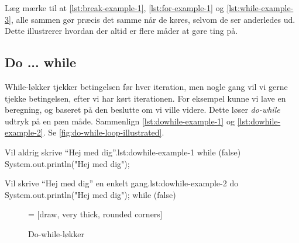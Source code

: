         Læg mærke til at \autoref{lst:break-example-1},
        \autoref{lst:for-example-1} og \autoref{lst:while-example-3}, alle
        sammen gør præcis det samme når de køres, selvom de ser
        anderledes ud. Dette illustrerer hvordan der altid er flere
        måder at gøre ting på.


	\subsection{Do ... while}

        While-løkker tjekker betingelsen før hver iteration, men nogle
        gang vil vi gerne tjekke betingelsen, efter vi har kørt
        iterationen. For eksempel kunne vi lave en beregning, og
        baseret på den beslutte om vi ville videre. Dette løser
        \emph{do-while} udtryk på en pæn måde. Sammenlign
        \autoref{lst:dowhile-example-1} og
        \autoref{lst:dowhile-example-2}. Se \autoref{fig:do-while-loop-illustrated}.

		\begin{JavaCode}{Vil aldrig skrive ``Hej med dig''.}{lst:dowhile-example-1}
			while (false) {
				System.out.println("Hej med dig");
			}
		\end{JavaCode}

		\begin{JavaCode}{Vil skrive ``Hej med dig'' en enkelt gang.}{lst:dowhile-example-2}
			do {
				System.out.println("Hej med dig");
			} while (false)
		\end{JavaCode}

        \begin{figure}
        \center
         = [draw, very thick, rounded corners]
        \caption{Do-while-løkker}
        \label{fig:do-while-loop-illustrated}
        \end{figure}

